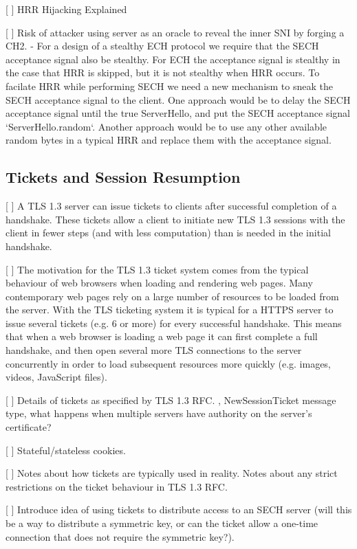 [ ] HRR Hijacking Explained

[ ] Risk of attacker using server as an oracle to reveal the inner SNI by forging a CH2.
        - For a design of a stealthy ECH protocol we require that the SECH acceptance signal also be stealthy. For ECH the acceptance signal is stealthy in the case that HRR is skipped, but it is not stealthy when HRR occurs. To facilate HRR while performing SECH we need a new mechanism to sneak the SECH acceptance signal to the client. One approach would be to delay the SECH acceptance signal until the true ServerHello, and put the SECH acceptance signal `ServerHello.random`. Another approach would be to use any other available random bytes in a typical HRR and replace them with the acceptance signal.

\subsection{Tickets and Session Resumption}

[ ] A TLS 1.3 server can issue tickets to clients after successful completion of a handshake. These tickets allow a client to initiate new TLS 1.3 sessions with the client in fewer steps (and with less computation) than is needed in the initial handshake.

[ ] The motivation for the TLS 1.3 ticket system comes from the typical behaviour of web browsers when loading and rendering web pages. Many contemporary web pages rely on a large number of resources to be loaded from the server. With the TLS ticketing system it is typical for a HTTPS server to issue several tickets (e.g. 6 or more) for every successful handshake. This means that when a web browser is loading a web page it can first complete a full handshake, and then open several more TLS connections to the server concurrently in order to load subsequent resources more quickly (e.g. images, videos, JavaScript files).

[ ] Details of tickets as specified by TLS 1.3 RFC. , NewSessionTicket message type, what happens when multiple servers have authority on the server's certificate?

[ ] Stateful/stateless cookies.

[ ] Notes about how tickets are typically used in reality. Notes about any strict restrictions on the ticket behaviour in TLS 1.3 RFC.

[ ] Introduce idea of using tickets to distribute access to an SECH server (will this be a way to distribute a symmetric key, or can the ticket allow a one-time connection that does not require the symmetric key?).

